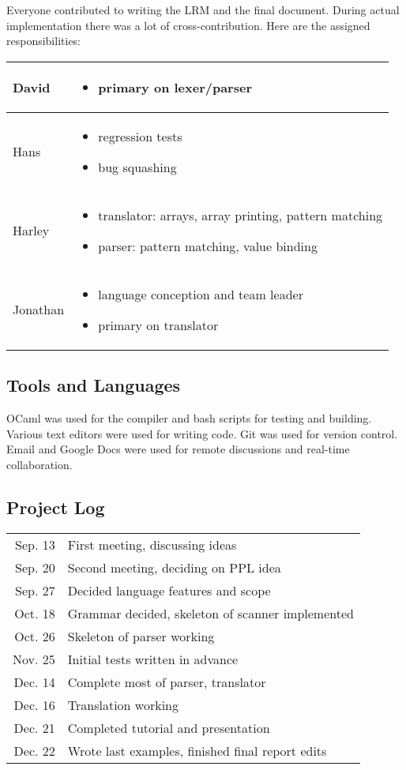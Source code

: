 Everyone contributed to writing the LRM and the final document. During  actual implementation there was a lot of cross-contribution. Here are the assigned responsibilities:
\begin{center}
\begin{tabular}{ | l | p{10cm} |}
\hline
David & \begin{itemize}
			\item primary on lexer/parser
		\end{itemize} \\ 
\hline
Hans & \begin{itemize}
			\item regression tests
			\item bug squashing
	   \end{itemize} \\
\hline
Harley & \begin{itemize}
			\item translator: arrays, array printing, pattern matching
			\item parser: pattern matching, value binding
		 \end{itemize} \\
\hline
Jonathan & \begin{itemize}
			\item language conception and team leader 
			\item primary on translator	 
		   \end{itemize}  \\
\hline
\end{tabular}
\end{center}

\subsection{Tools and Languages}
OCaml was used for the compiler and bash scripts for testing and building. Various text editors were used for writing code. Git was used for version control. Email and Google Docs were used for remote discussions and real-time collaboration.

\subsection{Project Log}
\begin{tabular}{r l}
Sep. 13 & First meeting, discussing ideas\\
Sep. 20 & Second meeting, deciding on PPL idea\\
Sep. 27 & Decided language features and scope\\
Oct. 18 & Grammar decided, skeleton of scanner implemented\\
Oct. 26 & Skeleton of parser working\\
Nov. 25 & Initial tests written in advance\\
Dec. 14 & Complete most of parser, translator\\
Dec. 16 & Translation working\\
Dec. 21 & Completed tutorial and presentation\\
Dec. 22 & Wrote last examples, finished final report edits\\
\end{tabular}
